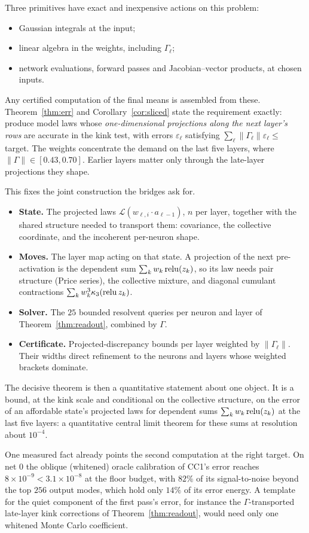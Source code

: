 Three primitives have exact and inexpensive actions on this problem:
\begin{itemize}[leftmargin=1.5em]
\item Gaussian integrals at the input;
\item linear algebra in the weights, including $\Gamma_\ell$;
\item network evaluations, forward passes and Jacobian--vector products, at chosen inputs.
\end{itemize}
Any certified computation of the final means is assembled from these. Theorem~\ref{thm:err} and
Corollary~\ref{cor:sliced} state the requirement exactly: produce model laws whose \emph{one-dimensional projections along
the next layer's rows} are accurate in the kink test, with errors $\varepsilon_\ell$ satisfying
$\sum_\ell\|\Gamma_\ell\|\varepsilon_\ell\le$ target. The weights concentrate the demand on the last five layers, where
$\|\Gamma\|\in[0.43,0.70]$. Earlier layers matter only through the late-layer projections they shape.

This fixes the joint construction the bridges ask for.
\begin{itemize}[leftmargin=1.5em]
\item \textbf{State.} The projected laws $\mathcal L(w_{\ell,i}\cdot a_{\ell-1})$, $n$ per layer, together with the shared
structure needed to transport them: covariance, the collective coordinate, and the incoherent per-neuron shape.
\item \textbf{Moves.} The layer map acting on that state. A projection of the next pre-activation is the dependent sum
$\sum_kw_k\operatorname{relu}(z_k)$, so its law needs pair structure (Price series), the collective mixture, and diagonal cumulant
contractions $\sum_kw_k^3\kappa_3(\operatorname{relu} z_k)$.
\item \textbf{Solver.} The $25$ bounded resolvent queries per neuron and layer of Theorem~\ref{thm:readout}, combined by
$\Gamma$.
\item \textbf{Certificate.} Projected-discrepancy bounds per layer weighted by $\|\Gamma_\ell\|$. Their widths direct
refinement to the neurons and layers whose weighted brackets dominate.
\end{itemize}
The decisive theorem is then a quantitative statement about one object. It is a bound, at the kink scale and conditional
on the collective structure, on the error of an affordable state's projected laws for dependent sums
$\sum_kw_k\operatorname{relu}(z_k)$ at the last five layers: a quantitative central limit theorem for these sums at resolution about
$10^{-4}$.

One measured fact already points the second computation at the right target. On net 0 the oblique (whitened) oracle
calibration of CC1's error reaches $8\times10^{-9}<3.1\times10^{-8}$ at the floor budget, with $82\%$ of its
signal-to-noise beyond the top $256$ output modes, which hold only $14\%$ of its error energy. A template for the quiet component of the first pass's error,
for instance the $\Gamma$-transported late-layer kink corrections of Theorem~\ref{thm:readout}, would need only one
whitened Monte Carlo coefficient.
